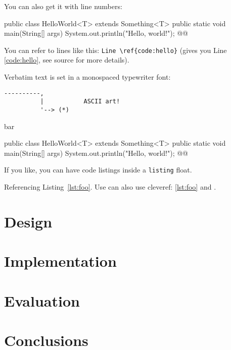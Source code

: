 \documentclass[11pt,titlepage,openright]{book}
\makeatletter
\renewenvironment{listing*}[1][]{%
  \begin{listing}[#1]%
    \checkoddpage%
    \ifoddpage%
      \begin{adjustwidth}{0cm}{-45mm}%
    \else%
      \begin{adjustwidth}{-45mm}{0cm}%
    \fi%
    }{%
    \end{adjustwidth}%
  \end{listing}}
\renewcommand{\c}[1]{\lstinline[style=std]@#1@}
\makeatother
\begin{document}
You can also get it with line numbers:

\begin{Code_Numbered}
public class HelloWorld<T> extends Something<T> {
  public static void main(String[] args) {
    System.out.println("Hello, world!"); @\label{code:hello}@
  }
}
\end{Code_Numbered}


You can refer to lines like this: \verb+Line \ref{code:hello}+ (gives you Line \ref{code:hello}, see source for more details).

Verbatim text is set in a monospaced typewriter font:

\begin{verbatim}
----------,
          |           ASCII art!
          '--> (*)
\end{verbatim}

\lipsum[2-4]

\begin{table}[!h]
  \caption{bar}
  \label{tab:bar}
\end{table}

\begin{listing*}[t]
\begin{Code_Numbered}
public class HelloWorld<T> extends Something<T> {
  public static void main(String[] args) {
    System.out.println("Hello, world!"); @\label{code:hello}@
  }
}
\end{Code_Numbered}
\caption{If you like, you can have code listings inside a \c{listing} float.}
\label{lst:foo}
\end{listing*}

Referencing Listing~\ref{lst:foo}.
Use can also use cleveref: \cref{lst:foo} and .

\chapter{Design}
\lipsum

\chapter{Implementation}
\lipsum

\chapter{Evaluation}
\lipsum

\chapter{Conclusions}
\lipsum



\end{document}
